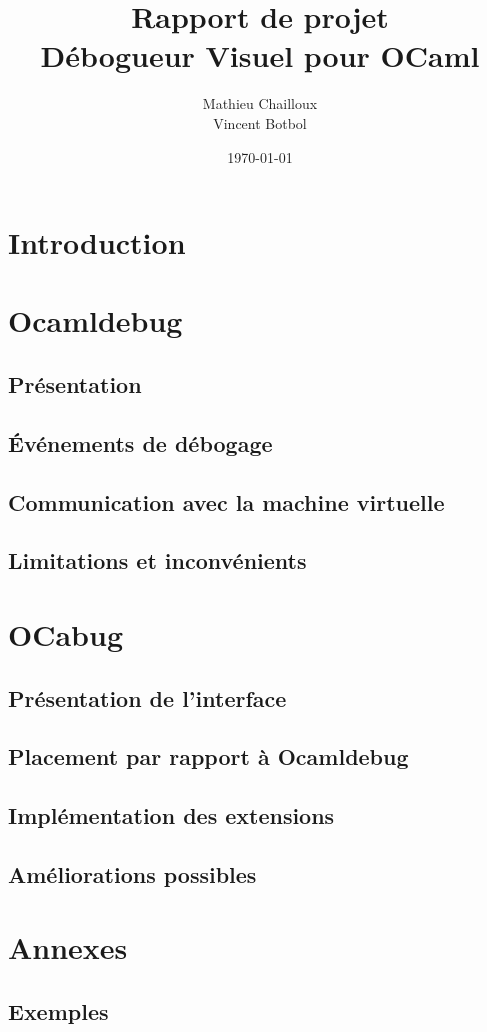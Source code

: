 \documentclass[11pt,a4paper]{report}
\title{Rapport de projet\\Débogueur Visuel pour OCaml}
\author{Mathieu Chailloux\\Vincent Botbol}
\date\today
\begin{document}
\maketitle

\chapter{Introduction}

\chapter{Ocamldebug}

\section{Présentation}
\section{\'Evénements de débogage}
\section{Communication avec la machine virtuelle}
\section{Limitations et inconvénients} %


\chapter{OCabug}


\section{Présentation de l'interface}
\section{Placement par rapport à Ocamldebug}
\section{Implémentation des extensions}
\section{Améliorations possibles}


\chapter{Annexes}

\section{Exemples}
\end{document}
